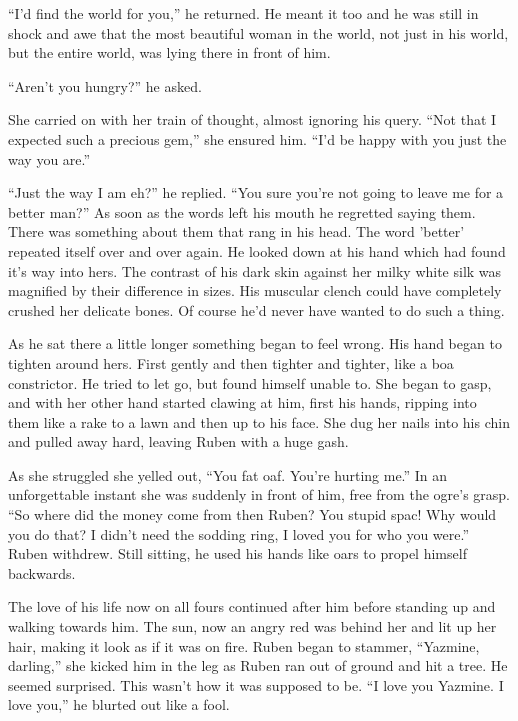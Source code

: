 ``I'd find the world for you,'' he returned.  He meant it too and he was still in shock and awe that the most beautiful woman in the world, not just in his world, but the entire world, was lying there in front of him.  

``Aren't you hungry?'' he asked.  

She carried on with her train of thought, almost ignoring his query.  ``Not that I expected such a precious gem,'' she ensured him.  ``I'd be happy with you just the way you are.''

``Just the way I am eh?'' he replied.  ``You sure you're not going to leave me for a better man?''  As soon as the words left his mouth he regretted saying them.  There was something about them that rang in his head.  The word 'better' repeated itself over and over again.  He looked down at his hand which had found it's way into hers.  The contrast of his dark skin against her milky white silk was magnified by their difference in sizes.  His muscular clench could have completely crushed her delicate bones.  Of course he'd never have wanted to do such a thing.  

As he sat there a little longer something began to feel wrong.  His hand began to tighten around hers.  First gently and then tighter and tighter, like a boa constrictor.  He tried to let go, but found himself unable to.  She began to gasp, and with her other hand started clawing at him, first his hands, ripping into them like a rake to a lawn and then up to his face.  She dug her nails into his chin and pulled away hard, leaving Ruben with a huge gash.  

As she struggled she yelled out, ``You fat oaf.  You're hurting me.''  In an unforgettable instant she was suddenly in front of him, free from the ogre's grasp.  ``So where did the money come from then Ruben?  You stupid spac!  Why would you do that?  I didn't need the sodding ring, I loved you for who you were.''  Ruben withdrew.  Still sitting, he used his hands like oars to propel himself backwards.  

The love of his life now on all fours continued after him before standing up and walking towards him.  The sun, now an angry red was behind her and lit up her hair, making it look as if it was on fire.  Ruben began to stammer, ``Yazmine, darling,'' she kicked him in the leg as Ruben ran out of ground and hit a tree.  He seemed surprised.  This wasn't how it was supposed to be.  ``I love you Yazmine.  I love you,'' he blurted out like a fool.

